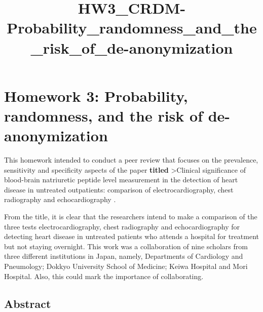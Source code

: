 \documentclass[11pt]{article}
\title{HW3\_CRDM-Probability\_randomness\_and\_the\_risk\_of\_de-anonymization}
\begin{document}
    
    \maketitle
    
    

    
    \hypertarget{homework-3-probability-randomness-and-the-risk-of-de-anonymization}{%
\section{Homework 3: Probability, randomness, and the risk of
de-anonymization}\label{homework-3-probability-randomness-and-the-risk-of-de-anonymization}}

This homework intended to conduct a peer review that focuses on the
prevalence, sensitivity and specificity aspects of the paper
\textbf{titled} \textgreater Clinical significance of blood-brain
natriuretic peptide level measurement in the detection of heart disease
in untreated outpatients: comparison of electrocardiography, chest
radiography and echocardiography \cite{4980048/HE2LER3V}.

From the title, it is clear that the researchers intend to make a
comparison of the three tests electrocardiography, chest radiography and
echocardiography for detecting heart disease in untreated patients who
attends a hospital for treatment but not staying overnight. This work
was a collaboration of nine scholars from three different institutions
in Japan, namely, Departments of Cardiology and Pneumology; Dokkyo
University School of Medicine; Keiwa Hospital and Mori Hospital. Also,
this could mark the importance of collaborating.

\hypertarget{abstract}{%
\subsection{\texorpdfstring{\textbf{Abstract}}{Abstract}}\label{abstract}}
\end{document}
